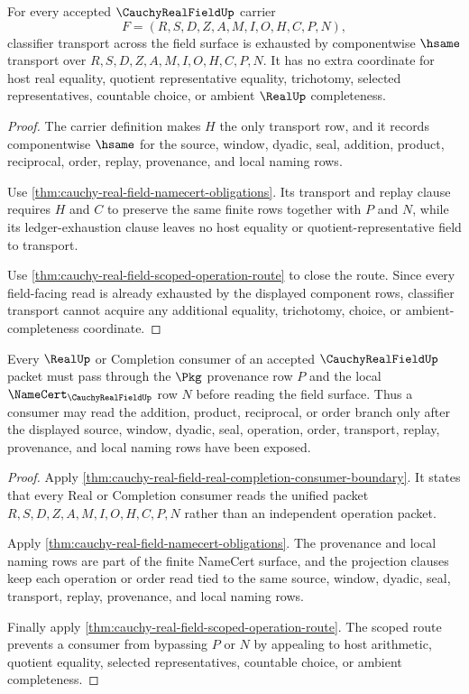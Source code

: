\begin{theorem}
\label{thm:cauchy-real-field-classifier-transport-obligation}
For every accepted $\CauchyRealFieldUp$ carrier
$$
F=(R,S,D,Z,A,M,I,O,H,C,P,N),
$$
classifier transport across the field surface is exhausted by componentwise $\hsame$ transport over $R,S,D,Z,A,M,I,O,H,C,P,N$. It has no extra coordinate for host real equality, quotient representative equality, trichotomy, selected representatives, countable choice, or ambient $\RealUp$ completeness.
\end{theorem}
\begin{proof}
The carrier definition makes $H$ the only transport row, and it records componentwise $\hsame$ for the source, window, dyadic, seal, addition, product, reciprocal, order, replay, provenance, and local naming rows.

Use \autoref{thm:cauchy-real-field-namecert-obligations}. Its transport and replay clause requires $H$ and $C$ to preserve the same finite rows together with $P$ and $N$, while its ledger-exhaustion clause leaves no host equality or quotient-representative field to transport.

Use \autoref{thm:cauchy-real-field-scoped-operation-route} to close the route. Since every field-facing read is already exhausted by the displayed component rows, classifier transport cannot acquire any additional equality, trichotomy, choice, or ambient-completeness coordinate.
\end{proof}

\begin{theorem}
\label{thm:cauchy-real-field-ledger-provenance-obligation}
Every $\RealUp$ or Completion consumer of an accepted $\CauchyRealFieldUp$ packet must pass through the $\Pkg$ provenance row $P$ and the local $\NameCert_{\CauchyRealFieldUp}$ row $N$ before reading the field surface. Thus a consumer may read the addition, product, reciprocal, or order branch only after the displayed source, window, dyadic, seal, operation, order, transport, replay, provenance, and local naming rows have been exposed.
\end{theorem}
\begin{proof}
Apply \autoref{thm:cauchy-real-field-real-completion-consumer-boundary}. It states that every Real or Completion consumer reads the unified packet $R,S,D,Z,A,M,I,O,H,C,P,N$ rather than an independent operation packet.

Apply \autoref{thm:cauchy-real-field-namecert-obligations}. The provenance and local naming rows are part of the finite NameCert surface, and the projection clauses keep each operation or order read tied to the same source, window, dyadic, seal, transport, replay, provenance, and local naming rows.

Finally apply \autoref{thm:cauchy-real-field-scoped-operation-route}. The scoped route prevents a consumer from bypassing $P$ or $N$ by appealing to host arithmetic, quotient equality, selected representatives, countable choice, or ambient completeness.
\end{proof}

